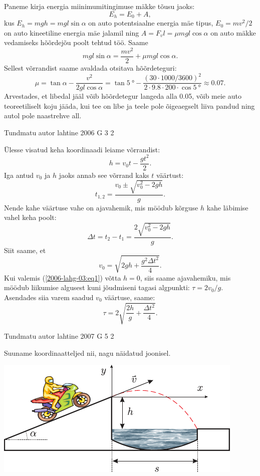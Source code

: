 \documentclass[11pt, twoside]{article}
\begin{document}
{{Paneme kirja energia miinimumitingimuse mäkke tõusu jaoks:
\[
E_h = E_0 + A,
\]
kus $E_h = mgh = mgl\sin \alpha$ on auto potentsiaalne energia mäe tipus, $E_0 = mv^2/2$ on auto kineetiline energia mäe jalamil ning $A = F_vl = \mu mgl \cos \alpha$ on auto mäkke vedamiseks hõõrdejõu poolt tehtud töö. Saame
\[
m g l \sin \alpha=\frac{m v^{2}}{2}+\mu m g l \cos \alpha.
\]
Sellest võrrandist saame avaldada otsitava hõõrdeteguri:
\[
\mu=\tan \alpha-\frac{v^{2}}{2 g l \cos \alpha}=\tan \SI{5}{\degree}-\frac{(\num{30} \cdot \num{1000} / \num{3600})^{2}}{\num{2} \cdot \num{9,8} \cdot \num{200} \cdot \cos \SI{5}{\degree}} \approx \num{0,07}.
\]
Arvestades, et libedal jääl võib hõõrdetegur langeda alla \num{0,05}, võib meie auto teoreetiliselt koju jääda, kui tee on libe ja teele pole õigeaegselt liiva pandud ning autol pole naastrehve all.
\fi
}

{Tundmatu autor} %
{lahtine} %
{2006} %
{G 3} %
{2} %
{

\ifSolution
Ülesse visatud keha koordinaadi leiame võrrandist: 
\[
h = v_0t - \frac{gt^2}{2}.
\]
Iga antud $v_0$ ja $h$ jaoks annab see võrrand kaks $t$ väärtust:
\[
t_{1,2}=\frac{v_{0} \pm \sqrt{v_{0}^{2}-2 g h}}{g}.
\]
Nende kahe väärtuse vahe on ajavahemik, mis möödub kõrguse $h$ kahe läbimise vahel keha poolt:
\begin{equation} \label{2006-lahg-03:eq1}
\Delta t=t_{2}-t_{1}=\frac{2 \sqrt{v_{0}^{2}-2 g h}}{g}.
\end{equation}
Siit saame, et
\[
v_{0}=\sqrt{2 g h+\frac{g^{2} \Delta t^{2}}{4}}.
\]
Kui valemis (\ref{2006-lahg-03:eq1}) võtta $h = 0$, siis saame ajavahemiku, mis möödub liikumise algusest kuni jõudmiseni tagasi algpunkti: $\tau = 2v_0/g$. Asendades siia varem saadud $v_0$ väärtuse, saame:
\[
\tau=2 \sqrt{\frac{2 h}{g}+\frac{\Delta t^{2}}{4}}.
\]
\fi
}

{Tundmatu autor} %
{lahtine} %
{2007} %
{G 5} %
{2} %
{

\ifSolution
Suuname koordinaatteljed nii, nagu näidatud joonisel.

\begin{center}
	\includegraphics[width=0.8\linewidth]{2007-lahg-05-lah}
\end{center}

}}
\end{document}
